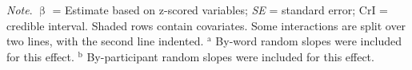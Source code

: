 \documentclass[
  12pt,
  man,floatsintext]{apa7}
\begin{document}
\begin{table}[H]
\begin{threeparttable}
\begin{tabular}[t]{lrrrr}
\bottomrule
\end{tabular}
\begin{tablenotes}
\item \textit{\linebreak} 
\item \textit{Note}. $\upbeta$ = Estimate based on z-scored variables; \textit{SE} = standard error; \linebreak \phantom{.}CrI = credible interval. Shaded rows contain covariates. Some interactions \linebreak \phantom{.}are split over two lines, with the second line indented. \linebreak \linebreak \phantom{.}$^{\text{a}}$ By-word random slopes were included for this effect. \linebreak \phantom{.}$^{\text{b}}$ By-participant random slopes were included for this effect.
\end{tablenotes}
\end{threeparttable}
\end{table}
\end{document}
